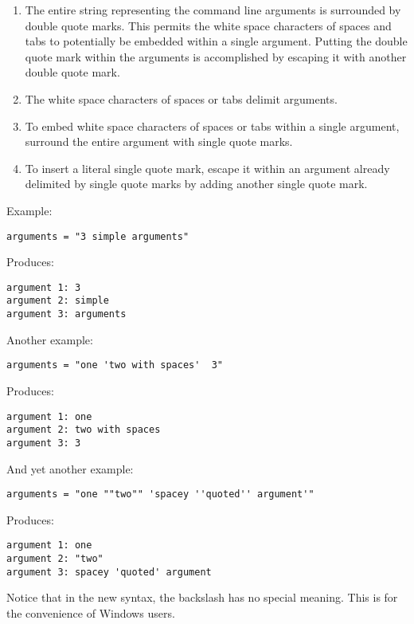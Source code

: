 \begin{description}
\begin{enumerate}

\item The entire string representing the command line arguments is
surrounded by double quote marks.
This permits the white space characters of spaces and tabs to potentially
be embedded within a single argument. 
Putting the double quote mark within the arguments
is accomplished by escaping it with another double quote mark.

\item The white space characters of spaces or tabs delimit arguments.

\item To embed white space characters of spaces or tabs within a 
single argument,
surround the entire argument with single quote marks.

\item To insert a literal single quote mark, escape it within
an argument already delimited by single quote marks
by adding another single quote mark.

\end{enumerate}

Example:
\begin{verbatim}
arguments = "3 simple arguments"
\end{verbatim}
Produces:
\begin{verbatim}
argument 1: 3
argument 2: simple
argument 3: arguments
\end{verbatim}

Another example:
\begin{verbatim}
arguments = "one 'two with spaces'	3"
\end{verbatim}
Produces:
\begin{verbatim}
argument 1: one
argument 2: two with spaces
argument 3: 3
\end{verbatim}

And yet another example:
\begin{verbatim}
arguments = "one ""two"" 'spacey ''quoted'' argument'"
\end{verbatim}

Produces:
\begin{verbatim}
argument 1: one
argument 2: "two"
argument 3: spacey 'quoted' argument
\end{verbatim}

Notice that in the new syntax, the backslash has no special meaning.
This is for the convenience of Windows users.



\end{description}

